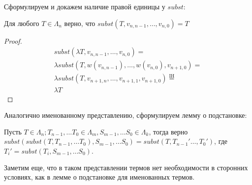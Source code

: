 Сформулируем и докажем наличие правой единицы у $subst$:
\begin{prop}
  Для любого $T \in \Lambda_{n}$ верно, что $subst(T, v_{n, n-1}, \dots, v_{n,0}) = T$
\end{prop}

\begin{proof}
  \begin{gather*}
      subst(\lambda T, v_{n, n-1}, \dots, v_{n, 0}) = \\
      \lambda subst(T, w(v_{n, n-1}), \dots, w(v_{n,0}), v_{n+1, 0}) = \\
      \lambda subst(T, v_{n+1, n}, \dots, v_{n + 1,1}, v_{n+1, 0}) \overset{\mathrm{IH}}{=} \\
      \lambda T
  \end{gather*}
\end{proof}

Аналогично именованному представлению, сформулируем лемму о подстановке:

\begin{prop}
  \label{index:assoc}
  Пусть $T \in \Lambda_{n}; T_{n - 1}, \dots T_{0} \in \Lambda_{m}, S_{m-1}, \dots S_{0} \in \Lambda_{k}$, тогда верно $subst(subst(T, T_{n - 1}, \dots T_{0}), S_{m-1}, \dots S_{0}) = subst(T, T_{n - 1}' \dots, T_{0}')$, где $T_{i}' = subst(T_{i}, S_{m-1}, \dots S_{0})$.
\end{prop}

Заметим еще, что в таком представлении термов нет необходимости в сторонних условиях, как в лемме о подстановке для именованных термов.

